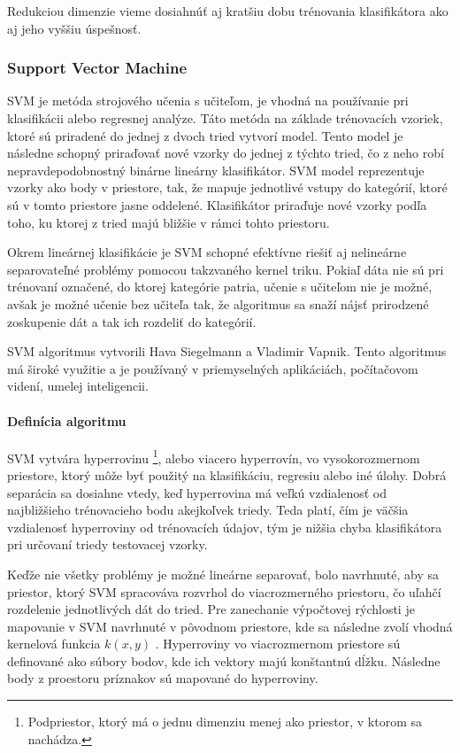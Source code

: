 Redukciou dimenzie vieme dosiahnúť aj kratšiu dobu trénovania klasifikátora ako aj jeho vyššiu úspešnosť. 


\subsubsection{Support Vector Machine} \label{SVMlabel}
SVM je metóda strojového učenia s učiteľom, je vhodná na používanie pri klasifikácii alebo regresnej analýze. Táto metóda na základe trénovacích vzoriek, ktoré sú priradené do jednej z dvoch tried vytvorí model. Tento model je následne schopný priraďovať nové vzorky do jednej z týchto tried, čo z neho robí nepravdepodobnostný binárne lineárny klasifikátor. SVM model reprezentuje vzorky ako body v priestore, tak, že mapuje jednotlivé vstupy do kategórií, ktoré sú v tomto priestore jasne oddelené. Klasifikátor priraďuje nové vzorky podľa toho, ku ktorej z tried majú bližšie v rámci tohto priestoru.

Okrem lineárnej klasifikácie je SVM schopné efektívne riešiť aj nelineárne separovateľné problémy pomocou takzvaného kernel triku. Pokiaľ dáta nie sú pri trénovaní označené, do ktorej kategórie patria, učenie s učiteľom nie je možné, avšak je možné učenie bez učiteľa tak, že algoritmus sa snaží nájsť prirodzené zoskupenie dát a tak ich rozdeliť do kategórií.

SVM algoritmus vytvorili Hava Siegelmann a Vladimir Vapnik. Tento algoritmus má široké využitie a je používaný v priemyselných aplikáciách, počítačovom videní, umelej inteligencii.  \cite{c7}

\paragraph{Definícia algoritmu}
SVM vytvára hyperrovinu \footnote{Podpriestor, ktorý má o jednu dimenziu menej ako priestor, v ktorom sa nachádza.}, alebo viacero hyperrovín, vo vysokorozmernom priestore, ktorý môže byť použitý na klasifikáciu, regresiu alebo iné úlohy. Dobrá separácia sa dosiahne vtedy, keď hyperrovina má veľkú vzdialenosť od najbližšieho trénovacieho bodu akejkoľvek triedy. Teda platí, čím je väčšia vzdialenosť hyperroviny od trénovacích údajov, tým je nižšia chyba klasifikátora pri určovaní triedy testovacej vzorky.\cite{c12}

Keďže nie všetky problémy je možné lineárne separovať, bolo navrhnuté, aby sa priestor, ktorý SVM spracováva rozvrhol do viacrozmerného priestoru, čo uľahčí rozdelenie jednotlivých dát do tried. Pre zanechanie výpočtovej rýchlosti je mapovanie v SVM navrhnuté v pôvodnom priestore, kde sa následne zvolí vhodná kernelová funkcia $ k(x,y)$ . 
Hyperroviny vo viacrozmernom priestore sú definované ako súbory bodov, kde ich vektory majú konštantnú dĺžku. Následne body z proestoru príznakov sú mapované do hyperroviny. 

